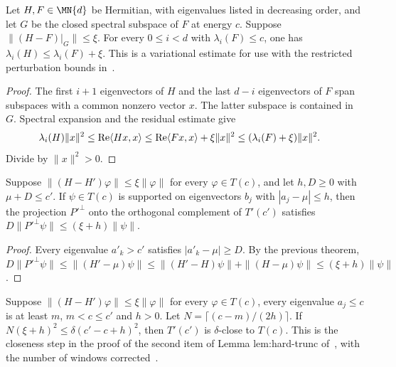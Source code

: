 \begin{theorem}
    \label{thm:low_spectral_eigenvalue_comparison}
    \leanok
    Let $H,F\in\MN{d}$ be Hermitian, with eigenvalues listed in decreasing
    order, and let $G$ be the closed spectral subspace of $F$ at energy $c$.
    Suppose $\|(H-F)|_G\|\le\xi$. For every $0\le i<d$ with
    $\lambda_i(F)\le c$, one has $\lambda_i(H)\le\lambda_i(F)+\xi$.
    This is a variational estimate for use with the restricted perturbation
    bounds in~\cite[lines 955--968]{Arad2016RigorousRG}.
\end{theorem}
\begin{proof}
    \leanok
    The first $i+1$ eigenvectors of $H$ and the last $d-i$ eigenvectors of
    $F$ span subspaces with a common nonzero vector $x$. The latter subspace
    is contained in $G$. Spectral expansion and the residual estimate give
    \begin{align}
        \lambda_i(H)\|x\|^2
         & \le \operatorname{Re}\langle Hx,x\rangle
        \le \operatorname{Re}\langle Fx,x\rangle+\xi\|x\|^2
        \le (\lambda_i(F)+\xi)\|x\|^2.
        \notag
    \end{align}
    Divide by $\|x\|^2>0$.
\end{proof}

\begin{theorem}
    \label{thm:spectral_span_window}
    \leanok
    Suppose $\|(H-H')\varphi\|\le\xi\|\varphi\|$ for every $\varphi\in T(c)$,
    and let $h,D\ge0$ with $\mu+D\le c'$. If $\psi\in T(c)$ is supported on
    eigenvectors $b_j$ with $|a_j-\mu|\le h$, then the projection $P'^\perp$
    onto the orthogonal complement of $T'(c')$ satisfies
    $D\|P'^\perp\psi\|\le(\xi+h)\|\psi\|$.
\end{theorem}

\begin{proof}
    \leanok
    Every eigenvalue $a'_k>c'$ satisfies $|a'_k-\mu|\ge D$. By the previous
    theorem,
    $D\|P'^\perp\psi\|\le\|(H'-\mu)\psi\|\le\|(H'-H)\psi\|
        +\|(H-\mu)\psi\|\le(\xi+h)\|\psi\|$.
\end{proof}

\begin{theorem}
    \label{thm:spectral_span_close_of_perturbation}
    \leanok
    Suppose $\|(H-H')\varphi\|\le\xi\|\varphi\|$ for every $\varphi\in T(c)$,
    every eigenvalue $a_j\le c$ is at least $m$, $m<c\le c'$ and $h>0$. Let
    $N=\lceil(c-m)/(2h)\rceil$. If $N(\xi+h)^2\le\delta(c'-c+h)^2$, then
    $T'(c')$ is $\delta$-close to $T(c)$. This is the closeness step in the
    proof of the second item of Lemma lem:hard-trunc
    of~\cite[lines 953--969]{Arad2016RigorousRG}, with the number of windows
    corrected~\cite{gap:alvv16_hard_truncation_windows}.
\end{theorem}

